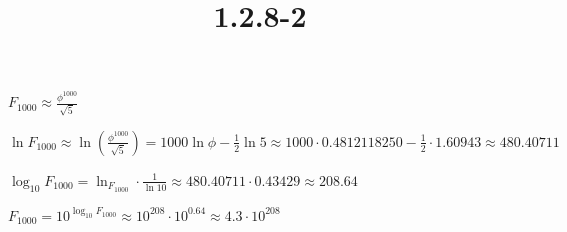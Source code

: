 \documentclass{article}
\title{1.2.8-2}
\begin{document}
\maketitle

\( F_{1000} \approx \frac{\phi^{1000}}{\sqrt{5}} \)

\( \ln{F_{1000}} \approx \ln(\frac{\phi^{1000}}{\sqrt{5}}) = 1000 \ln{\phi} - \frac{1}{2} \ln{5} \approx 1000 \cdot 0.4812118250 - \frac{1}{2} \cdot 1.60943 \approx 480.40711 \)

\( \log_{10}{F_{1000}} = \ln_{F_{1000}} \cdot \frac{1}{\ln{10}} \approx 480.40711 \cdot 0.43429 \approx 208.64 \)

\( F_{1000} = 10^{\log_{10}{F_{1000}}} \approx 10^{208} \cdot 10^{0.64} \approx 4.3 \cdot 10^{208} \)
\end{document}
